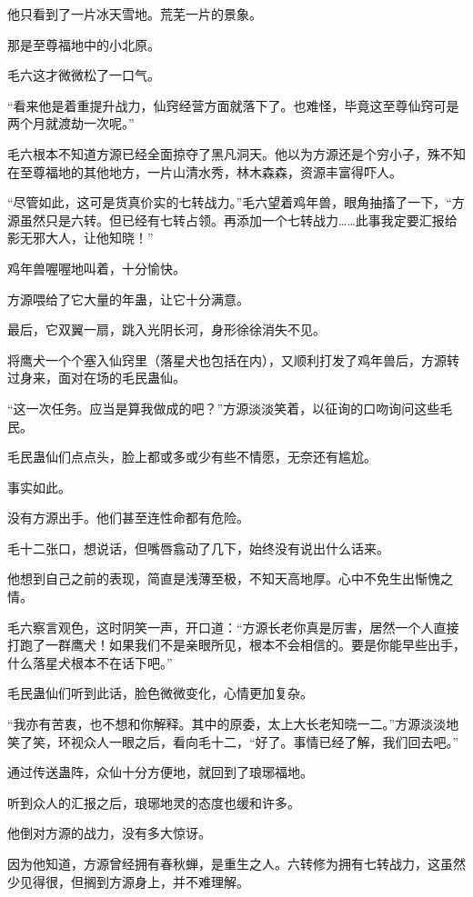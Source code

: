 \begin{this_body}
他只看到了一片冰天雪地。荒芜一片的景象。

那是至尊福地中的小北原。

毛六这才微微松了一口气。

“看来他是着重提升战力，仙窍经营方面就落下了。也难怪，毕竟这至尊仙窍可是两个月就渡劫一次呢。”

毛六根本不知道方源已经全面掠夺了黑凡洞天。他以为方源还是个穷小子，殊不知在至尊福地的其他地方，一片山清水秀，林木森森，资源丰富得吓人。

“尽管如此，这可是货真价实的七转战力。”毛六望着鸡年兽，眼角抽搐了一下，“方源虽然只是六转。但已经有七转占领。再添加一个七转战力……此事我定要汇报给影无邪大人，让他知晓！”

鸡年兽喔喔地叫着，十分愉快。

方源喂给了它大量的年蛊，让它十分满意。

最后，它双翼一扇，跳入光阴长河，身形徐徐消失不见。

将鹰犬一个个塞入仙窍里（落星犬也包括在内），又顺利打发了鸡年兽后，方源转过身来，面对在场的毛民蛊仙。

“这一次任务。应当是算我做成的吧？”方源淡淡笑着，以征询的口吻询问这些毛民。

毛民蛊仙们点点头，脸上都或多或少有些不情愿，无奈还有尴尬。

事实如此。

没有方源出手。他们甚至连性命都有危险。

毛十二张口，想说话，但嘴唇翕动了几下，始终没有说出什么话来。

他想到自己之前的表现，简直是浅薄至极，不知天高地厚。心中不免生出惭愧之情。

毛六察言观色，这时阴笑一声，开口道：“方源长老你真是厉害，居然一个人直接打跑了一群鹰犬！如果我们不是亲眼所见，根本不会相信的。要是你能早些出手，什么落星犬根本不在话下吧。”

毛民蛊仙们听到此话，脸色微微变化，心情更加复杂。

“我亦有苦衷，也不想和你解释。其中的原委，太上大长老知晓一二。”方源淡淡地笑了笑，环视众人一眼之后，看向毛十二，“好了。事情已经了解，我们回去吧。”

通过传送蛊阵，众仙十分方便地，就回到了琅琊福地。

听到众人的汇报之后，琅琊地灵的态度也缓和许多。

他倒对方源的战力，没有多大惊讶。

因为他知道，方源曾经拥有春秋蝉，是重生之人。六转修为拥有七转战力，这虽然少见得很，但搁到方源身上，并不难理解。


\end{this_body}
